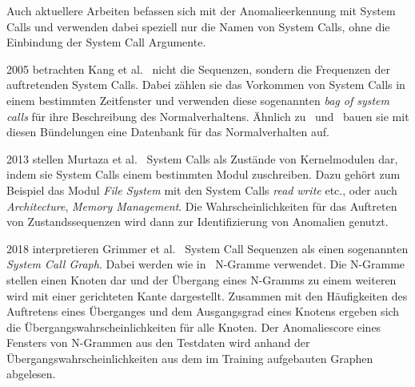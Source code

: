                 Auch aktuellere Arbeiten befassen sich mit der Anomalieerkennung mit System Calls und verwenden dabei speziell nur die Namen von System Calls, ohne die Einbindung der System Call Argumente.
            
                2005 betrachten Kang et al.~\cite{FREQUENCY2} nicht die Sequenzen, sondern die Frequenzen der auftretenden System Calls.
                Dabei zählen sie das Vorkommen von System Calls in einem bestimmten Zeitfenster und verwenden diese sogenannten \textit{bag of system calls} für ihre Beschreibung des Normalverhaltens.
                Ähnlich zu~\cite{FORREST} und~\cite{STIDE} bauen sie mit diesen Bündelungen eine Datenbank für das Normalverhalten auf.

                2013 stellen Murtaza et al.~\cite{SYSTEM_STATES} System Calls als Zustände von Kernelmodulen dar, indem sie System Calls einem bestimmten Modul zuschreiben.
                Dazu gehört zum Beispiel das Modul \textit{File System} mit den System Calls \textit{read} \textit{write} etc., oder auch \textit{Architecture}, \textit{Memory Management}.
                Die Wahrscheinlichkeiten für das Auftreten von Zustandssequenzen wird dann zur Identifizierung von Anomalien genutzt.

                2018 interpretieren Grimmer et al.~\cite{SYSCALL_GRAPHS} System Call Sequenzen als einen sogenannten \textit{System Call Graph}.
                Dabei werden wie in~\cite{STIDE_Alternatives} N-Gramme verwendet.
                Die N-Gramme stellen einen Knoten dar und der Übergang eines N-Gramms zu einem weiteren wird mit einer gerichteten Kante dargestellt.
                Zusammen mit den Häufigkeiten des Auftretens eines Überganges und dem Ausgangsgrad eines Knotens ergeben sich die Übergangswahrscheinlichkeiten für alle Knoten.
                Der Anomaliescore eines Fensters von N-Grammen aus den Testdaten wird anhand der Übergangswahrscheinlichkeiten aus dem im Training aufgebauten Graphen abgelesen.


